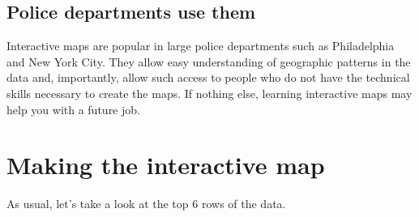 \documentclass[
]{krantz}
\begin{document}
\hypertarget{police-departments-use-them}{%
\subsection{Police departments use them}\label{police-departments-use-them}}

Interactive maps are popular in large police departments such as Philadelphia and New York City. They allow easy understanding of geographic patterns in the data and, importantly, allow such access to people who do not have the technical skills necessary to create the maps. If nothing else, learning interactive maps may help you with a future job.

\hypertarget{making-the-interactive-map}{%
\section{Making the interactive map}\label{making-the-interactive-map}}

As usual, let's take a look at the top 6 rows of the data.
\end{document}

